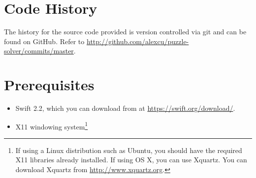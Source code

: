 \section*{Code History}
\label{sec:History}
The history for the source code provided is version controlled via git and can
be found on GitHub. Refer to \url{http://github.com/alexcu/puzzle-solver/commits/master}.

\section*{Prerequisites}
\begin{itemize}
  \item Swift 2.2, which you can download from at \url{https://swift.org/download/}.
  \item X11 windowing system\footnote{
    If using a Linux distribution such as Ubuntu, you should have the required
    X11 libraries already installed. If using OS X, you can use Xquartz. You can
    download Xquartz from \url{http://www.xquartz.org}.
  }
\end{itemize}
